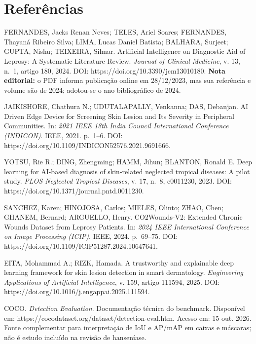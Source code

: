 \chapter*[Referências]{Referências}

FERNANDES, Jacks Renan Neves; TELES, Ariel Soares; FERNANDES, Thayaná
Ribeiro Silva; LIMA, Lucas Daniel Batista; BALHARA, Surjeet; GUPTA,
Nishu; TEIXEIRA, Silmar. Artificial Intelligence on Diagnostic Aid of
Leprosy: A Systematic Literature Review. \emph{Journal of Clinical
Medicine}, v. 13, n.~1, artigo 180, 2024. DOI:
https://doi.org/10.3390/jcm13010180. \textbf{Nota editorial:} o PDF
informa publicação online em 28/12/2023, mas sua referência e volume são
de 2024; adotou-se o ano bibliográfico de 2024.

JAIKISHORE, Chathura N.; UDUTALAPALLY, Venkanna; DAS, Debanjan. AI
Driven Edge Device for Screening Skin Lesion and Its Severity in
Peripheral Communities. In: \emph{2021 IEEE 18th India Council
International Conference (INDICON)}. IEEE, 2021. p.~1--6. DOI:
https://doi.org/10.1109/INDICON52576.2021.9691666.

YOTSU, Rie R.; DING, Zhengming; HAMM, Jihun; BLANTON, Ronald E. Deep
learning for AI-based diagnosis of skin-related neglected tropical
diseases: A pilot study. \emph{PLOS Neglected Tropical Diseases}, v. 17,
n.~8, e0011230, 2023. DOI: https://doi.org/10.1371/journal.pntd.0011230.

SANCHEZ, Karen; HINOJOSA, Carlos; MIELES, Olinto; ZHAO, Chen; GHANEM,
Bernard; ARGUELLO, Henry. CO2Wounds-V2: Extended Chronic Wounds Dataset
from Leprosy Patients. In: \emph{2024 IEEE International Conference on
Image Processing (ICIP)}. IEEE, 2024. p.~69--75. DOI:
https://doi.org/10.1109/ICIP51287.2024.10647641.

EITA, Mohammad A.; RIZK, Hamada. A trustworthy and explainable deep
learning framework for skin lesion detection in smart dermatology.
\emph{Engineering Applications of Artificial Intelligence}, v. 159,
artigo 111594, 2025. DOI:
https://doi.org/10.1016/j.engappai.2025.111594.

COCO. \emph{Detection Evaluation}. Documentação técnica do benchmark.
Disponível em: https://cocodataset.org/dataset/detection-eval.htm.
Acesso em: 15 out. 2026. Fonte complementar para interpretação de IoU e
AP/mAP em caixas e máscaras; não é estudo incluído na revisão de
hanseníase.

